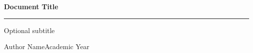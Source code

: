 \documentclass[a4paper,11pt]{book}
\numberwithin{equation}{chapter}
\newcommand{\BookTitle}{Document Title}
\newcommand{\BookSubtitle}{Optional subtitle}
\newcommand{\BookAuthor}{Author Name}
\newcommand{\BookYear}{Academic Year}
\begin{document}
\frontmatter

\begin{titlepage}
\thispagestyle{empty}


\begin{center}
\vspace*{18mm}

{\fontsize{28}{34}\selectfont\bfseries\color{Accent} \BookTitle\par}

\vspace{7mm}
{\color{Accent}\rule{0.66\textwidth}{1.1pt}}

\vspace{10mm}
{\Large\sffamily\color{TextGray}\BookSubtitle\par}

\vspace{20mm}


\vfill

{\sffamily\small\color{TextGray}
\BookAuthor \hfill \BookYear
}

\vspace*{6mm}
\end{center}
\end{titlepage}



\tableofcontents
\cleardoublepage

\mainmatter

% 
% 

\backmatter
\end{document}
